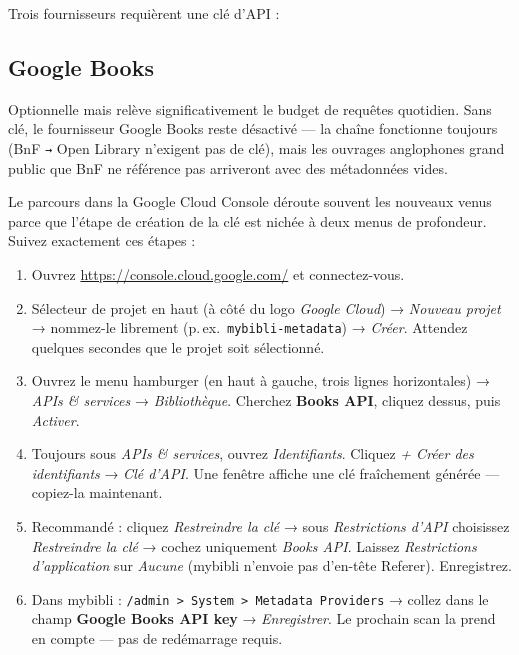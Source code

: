 Trois fournisseurs requièrent une clé d'API :

\subsection*{Google Books}

Optionnelle mais relève significativement le budget de requêtes
quotidien. Sans clé, le fournisseur Google Books reste désactivé —
la chaîne fonctionne toujours (BnF \texttt{→} Open Library
n'exigent pas de clé), mais les ouvrages anglophones grand public
que BnF ne référence pas arriveront avec des métadonnées vides.

Le parcours dans la Google Cloud Console déroute souvent les
nouveaux venus parce que l'étape de création de la clé est nichée
à deux menus de profondeur. Suivez exactement ces étapes :

\begin{enumerate}
  \item Ouvrez \url{https://console.cloud.google.com/} et
        connectez-vous.
  \item Sélecteur de projet en haut (à côté du logo
        \emph{Google Cloud}) → \emph{Nouveau projet} → nommez-le
        librement (p.\,ex.\ \texttt{mybibli-metadata}) →
        \emph{Créer}. Attendez quelques secondes que le projet
        soit sélectionné.
  \item Ouvrez le menu hamburger (en haut à gauche, trois lignes
        horizontales) → \emph{APIs \& services} →
        \emph{Bibliothèque}. Cherchez \textbf{Books API}, cliquez
        dessus, puis \emph{Activer}.
  \item Toujours sous \emph{APIs \& services}, ouvrez
        \emph{Identifiants}. Cliquez \emph{+ Créer des
        identifiants} → \emph{Clé d'API}. Une fenêtre affiche
        une clé fraîchement générée — copiez-la maintenant.
  \item Recommandé : cliquez \emph{Restreindre la clé} → sous
        \emph{Restrictions d'API} choisissez \emph{Restreindre la
        clé} → cochez uniquement \emph{Books API}. Laissez
        \emph{Restrictions d'application} sur \emph{Aucune}
        (mybibli n'envoie pas d'en-tête Referer). Enregistrez.
  \item Dans mybibli : \texttt{/admin > System > Metadata
        Providers} → collez dans le champ \textbf{Google Books
        API key} → \emph{Enregistrer}. Le prochain scan la prend
        en compte — pas de redémarrage requis.
\end{enumerate}

